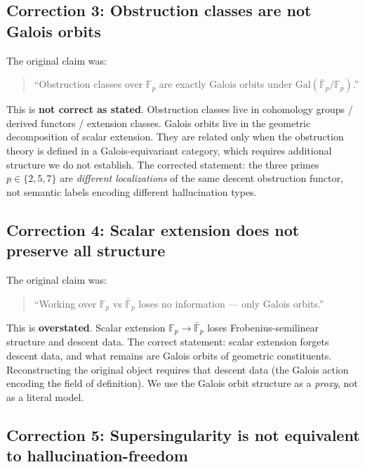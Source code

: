 \documentclass[11pt,a4paper]{article}
\begin{document}
\subsection*{Correction 3: Obstruction classes are not Galois orbits}

The original claim was:
\begin{quote}
``Obstruction classes over $\mathbb{F}_p$ are exactly Galois orbits
under $\mathrm{Gal}(\bar{\mathbb{F}}_p/\mathbb{F}_p)$.''
\end{quote}
This is \textbf{not correct as stated}.
Obstruction classes live in cohomology groups / derived functors / extension classes.
Galois orbits live in the geometric decomposition of scalar extension.
They are related only when the obstruction theory is defined in a
Galois-equivariant category, which requires additional structure
we do not establish.
The corrected statement: the three primes $p \in \{2,5,7\}$ are
\emph{different localizations} of the same descent obstruction functor,
not semantic labels encoding different hallucination types.

\subsection*{Correction 4: Scalar extension does not preserve all structure}

The original claim was:
\begin{quote}
``Working over $\mathbb{F}_p$ vs $\bar{\mathbb{F}}_p$ loses no information ---
only Galois orbits.''
\end{quote}
This is \textbf{overstated}. Scalar extension $\mathbb{F}_p \to \bar{\mathbb{F}}_p$
loses Frobenius-semilinear structure and descent data.
The correct statement: scalar extension forgets descent data, and what
remains are Galois orbits of geometric constituents.
Reconstructing the original object requires that descent data
(the Galois action encoding the field of definition).
We use the Galois orbit structure as a \emph{proxy}, not as a literal model.

\subsection*{Correction 5: Supersingularity is not equivalent to hallucination-freedom}
\end{document}
